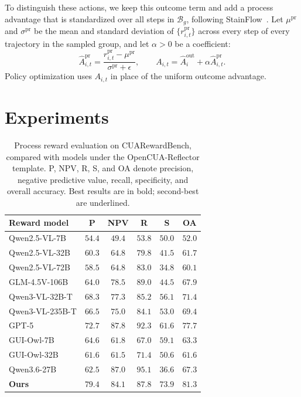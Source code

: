 To distinguish these actions, we keep this outcome term and add a process advantage that is standardized over all steps in $\mathcal{B}_g$, following StainFlow~\cite{hao2026stainflow}. Let $\mu^{\mathrm{pr}}$ and $\sigma^{\mathrm{pr}}$ be the mean and standard deviation of $\{r_{i,t}^{\mathrm{pr}}\}$ across every step of every trajectory in the sampled group, and let $\alpha>0$ be a coefficient:
\begin{equation}
    \hat{A}_{i,t}^{\mathrm{pr}}
    = \frac{r_{i,t}^{\mathrm{pr}}-\mu^{\mathrm{pr}}}{\sigma^{\mathrm{pr}}+\epsilon},
    \qquad
    A_{i,t}
    = \hat{A}_i^{\mathrm{out}} + \alpha\hat{A}_{i,t}^{\mathrm{pr}}.
\end{equation}
Policy optimization uses $A_{i,t}$ in place of the uniform outcome advantage.

\section{Experiments}
\label{sec:experiments}

\begin{table}[t]
\caption{Process reward evaluation on CUARewardBench, compared with models under the OpenCUA-Reflector template. P, NPV, R, S, and OA denote precision, negative predictive value, recall, specificity, and overall accuracy. Best results are in bold; second-best are underlined.}
\label{tab:cuarewardbench-opencua}
\centering
\small
\begin{tabular}{lccccc}
\toprule
Reward model & P & NPV & R & S & OA \\
\midrule
Qwen2.5-VL-7B & $54.4$ & $49.4$ & $53.8$ & $50.0$ & $52.0$ \\
Qwen2.5-VL-32B & $60.3$ & $64.8$ & $79.8$ & $41.5$ & $61.7$ \\
Qwen2.5-VL-72B & $58.5$ & $64.8$ & $83.0$ & $34.8$ & $60.1$ \\
GLM-4.5V-106B & $64.0$ & $78.5$ & $89.0$ & $44.5$ & $67.9$ \\
Qwen3-VL-32B-T & $68.3$ & $77.3$ & $85.2$ & $56.1$ & $71.4$ \\
Qwen3-VL-235B-T & $66.5$ & $75.0$ & $84.1$ & $53.0$ & $69.4$ \\
GPT-5 & \underline{$72.7$} & $\mathbf{87.8}$ & \underline{$92.3$} & \underline{$61.6$} & \underline{$77.7$} \\
GUI-Owl-7B & $64.6$ & $61.8$ & $67.0$ & $59.1$ & $63.3$ \\
GUI-Owl-32B & $61.6$ & $61.5$ & $71.4$ & $50.6$ & $61.6$ \\
Qwen3.6-27B & $62.5$ & \underline{$87.0$} & $\mathbf{95.1}$ & $36.6$ & $67.3$ \\
\textbf{Ours} & $\mathbf{79.4}$ & $84.1$ & $87.8$ & $\mathbf{73.9}$ & $\mathbf{81.3}$ \\
\bottomrule
\end{tabular}
\end{table}

